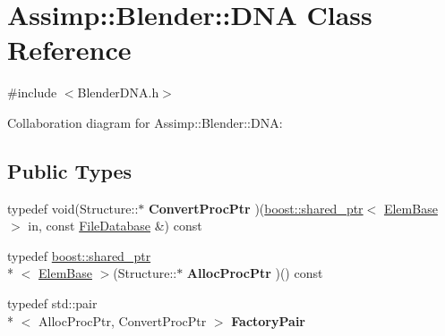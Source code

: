 \hypertarget{class_assimp_1_1_blender_1_1_d_n_a}{\section{Assimp\+:\+:Blender\+:\+:D\+N\+A Class Reference}
\label{class_assimp_1_1_blender_1_1_d_n_a}
}


{\ttfamily \#include $<$Blender\+D\+N\+A.\+h$>$}



Collaboration diagram for Assimp\+:\+:Blender\+:\+:D\+N\+A\+:
\subsection*{Public Types}
\begin{DoxyCompactItemize}
\item 
\hypertarget{class_assimp_1_1_blender_1_1_d_n_a_a0932627f7e0c72b1e80c853b2b32122f}{typedef void(Structure\+::$\ast$ {\bfseries Convert\+Proc\+Ptr} )(\hyperlink{classboost_1_1shared__ptr}{boost\+::shared\+\_\+ptr}$<$ \hyperlink{struct_assimp_1_1_blender_1_1_elem_base}{Elem\+Base} $>$ in, const \hyperlink{class_assimp_1_1_blender_1_1_file_database}{File\+Database} \&) const }\label{class_assimp_1_1_blender_1_1_d_n_a_a0932627f7e0c72b1e80c853b2b32122f}

\item 
\hypertarget{class_assimp_1_1_blender_1_1_d_n_a_a5830b069ef08e42eb3710859c0bd742b}{typedef \hyperlink{classboost_1_1shared__ptr}{boost\+::shared\+\_\+ptr}\\*
$<$ \hyperlink{struct_assimp_1_1_blender_1_1_elem_base}{Elem\+Base} $>$(Structure\+::$\ast$ {\bfseries Alloc\+Proc\+Ptr} )() const }\label{class_assimp_1_1_blender_1_1_d_n_a_a5830b069ef08e42eb3710859c0bd742b}

\item 
\hypertarget{class_assimp_1_1_blender_1_1_d_n_a_acd4060298c492d4394c0b2e8fa5e9179}{typedef std\+::pair\\*
$<$ Alloc\+Proc\+Ptr, Convert\+Proc\+Ptr $>$ {\bfseries Factory\+Pair}}\label{class_assimp_1_1_blender_1_1_d_n_a_acd4060298c492d4394c0b2e8fa5e9179}

\end{DoxyCompactItemize}
